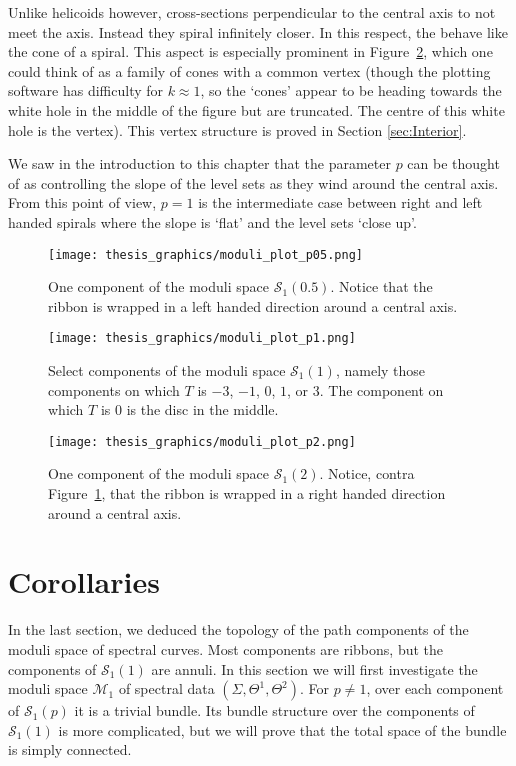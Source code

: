 Unlike helicoids however, cross-sections perpendicular to the central axis to not meet the axis. Instead they spiral infinitely closer. In this respect, the behave like the cone of a spiral. This aspect is especially prominent in Figure~\ref{fig:p1 plot}, which one could think of as a family of cones with a common vertex (though the plotting software has difficulty for $k\approx 1$, so the `cones' appear to be heading towards the white hole in the middle of the figure but are truncated. The centre of this white hole is the vertex). This vertex structure is proved in Section \ref{sec:Interior}.

We saw in the introduction to this chapter that the parameter $p$ can be thought of as controlling the slope of the level sets as they wind around the central axis. From this point of view, $p=1$ is the intermediate case between right and left handed spirals where the slope is `flat' and the level sets `close up'.

\begin{figure}
    \texttt{[image: thesis\_graphics/moduli\_plot\_p05.png]}
    \caption{One component of the moduli space $\mathcal{S}_1(0.5)$. Notice that the ribbon is wrapped in a left handed direction around a central axis.}
    \label{fig:p05 plot}
\end{figure}

\begin{figure}
    \texttt{[image: thesis\_graphics/moduli\_plot\_p1.png]}
    \caption{Select components of the moduli space $\mathcal{S}_1(1)$, namely those components on which $T$ is $-3$, $-1$, $0$, $1$, or $3$. The component on which $T$ is $0$ is the disc in the middle.}
    \label{fig:p1 plot}
\end{figure}

\begin{figure}
    \texttt{[image: thesis\_graphics/moduli\_plot\_p2.png]}
    \caption{One component of the moduli space $\mathcal{S}_1(2)$. Notice, contra Figure~\ref{fig:p05 plot}, that the ribbon is wrapped in a right handed direction around a central axis.}
    \label{fig:p2 plot}
\end{figure}



\section{Corollaries}
\label{sec:Corollaries}

In the last section, we deduced the topology of the path components of the moduli space of spectral curves. Most components are ribbons, but the components of $\mathcal{S}_1(1)$ are annuli. In this section we will first investigate the moduli space $\mathcal{M}_1$ of spectral data $(Σ,Θ^1,Θ^2)$. For $p\neq 1$, over each component of $\mathcal{S}_1(p)$ it is a trivial bundle. Its bundle structure over the components of $\mathcal{S}_1(1)$ is more complicated, but we will prove that the total space of the bundle is simply connected.

